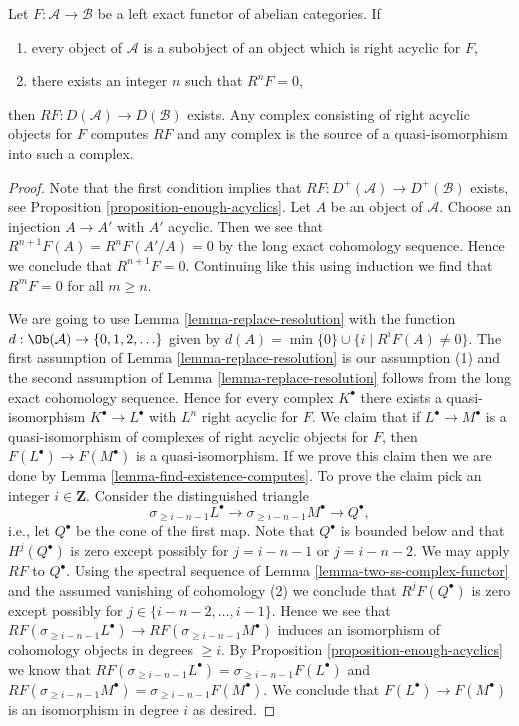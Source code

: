\begin{lemma}
\label{lemma-unbounded-right-derived}
Let $F : \mathcal{A} \to \mathcal{B}$ be a left exact functor of
abelian categories. If
\begin{enumerate}
\item every object of $\mathcal{A}$ is a subobject of an object
which is right acyclic for $F$,
\item there exists an integer $n$ such that $R^nF = 0$,
\end{enumerate}
then $RF : D(\mathcal{A}) \to D(\mathcal{B})$ exists. Any
complex consisting of right acyclic objects for $F$ computes
$RF$ and any complex is the source of a quasi-isomorphism
into such a complex.
\end{lemma}

\begin{proof}
Note that the first condition implies that
$RF : D^+(\mathcal{A}) \to D^+(\mathcal{B})$ exists, see
Proposition \ref{proposition-enough-acyclics}.
Let $A$ be an object of $\mathcal{A}$. Choose an injection $A \to A'$
with $A'$ acyclic. Then we see that $R^{n + 1}F(A) = R^nF(A'/A) = 0$ by
the long exact cohomology sequence. Hence we conclude that $R^{n + 1}F = 0$.
Continuing like this using induction we find that $R^mF = 0$ for all
$m \geq n$.

\medskip\noindent
We are going to use Lemma \ref{lemma-replace-resolution} with the function
$d : \Ob(\mathcal{A}) \to \{0, 1, 2, \ldots \}$ given by
$d(A) = \min \{0\} \cup \{i \mid R^iF(A) \not = 0\}$.
The first assumption of Lemma \ref{lemma-replace-resolution}
is our assumption (1) and the second assumption of
Lemma \ref{lemma-replace-resolution} follows from the long exact
cohomology sequence. Hence for every complex $K^\bullet$ there exists a
quasi-isomorphism $K^\bullet \to L^\bullet$ with $L^n$ right acyclic for $F$.
We claim that if $L^\bullet \to M^\bullet$ is a quasi-isomorphism of
complexes of right acyclic objects for $F$, then
$F(L^\bullet) \to F(M^\bullet)$
is a quasi-isomorphism. If we prove this claim then we are done by
Lemma \ref{lemma-find-existence-computes}.
To prove the claim pick an integer $i \in \mathbf{Z}$.
Consider the distinguished triangle
$$
\sigma_{\geq i - n - 1}L^\bullet \to
\sigma_{\geq i - n - 1}M^\bullet \to Q^\bullet,
$$
i.e., let $Q^\bullet$ be the cone of the first map.
Note that $Q^\bullet$ is bounded below and that
$H^j(Q^\bullet)$ is zero except possibly for $j = i - n - 1$
or $j = i - n - 2$. We may apply $RF$ to $Q^\bullet$.
Using the spectral sequence of Lemma \ref{lemma-two-ss-complex-functor}
and the assumed vanishing of cohomology (2) we conclude
that $R^jF(Q^\bullet)$ is zero except possibly for
$j \in \{i - n - 2, \ldots, i - 1\}$. Hence we see that
$RF(\sigma_{\geq i - n - 1}L^\bullet) \to RF(\sigma_{\geq i - n - 1}M^\bullet)$
induces an isomorphism of cohomology objects in degrees $\geq i$.
By Proposition \ref{proposition-enough-acyclics} we know that
$RF(\sigma_{\geq i - n - 1}L^\bullet) = \sigma_{\geq i - n - 1}F(L^\bullet)$
and
$RF(\sigma_{\geq i - n - 1}M^\bullet) = \sigma_{\geq i - n - 1}F(M^\bullet)$.
We conclude that $F(L^\bullet) \to F(M^\bullet)$
is an isomorphism in degree $i$ as desired.
\end{proof}

